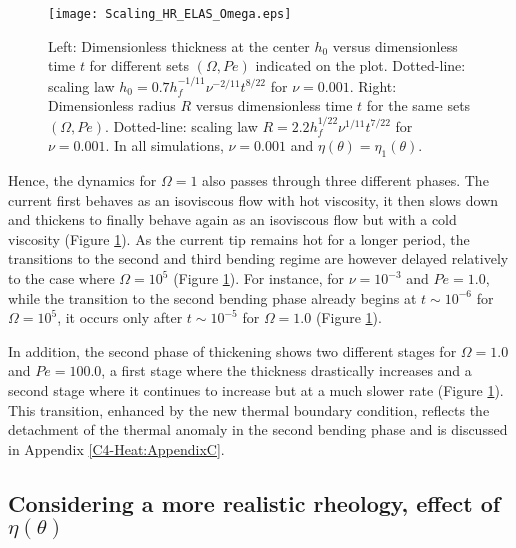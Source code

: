 \begin{figure}[h!]
  \begin{center}
    \graphicspath{ {/Users/thorey/Documents/These/Projet/Refroidissement/Skin_Model/Figure/Figure_Heating/} }
    \texttt{[image: Scaling\_HR\_ELAS\_Omega.eps]}
    \caption{Left: Dimensionless thickness at  the center $h_0$ versus
      dimensionless   time  $t$   for  different   sets  $(\Omega,Pe)$
      indicated    on   the    plot.     Dotted-line:   scaling    law
      $h_0=   0.7h_f^{-1/11}\nu^{-2/11}t^{8/22}$    for   $\nu=0.001$.
      Right: Dimensionless  radius $R$  versus dimensionless  time $t$
      for  the  same  sets $(\Omega,Pe)$.   Dotted-line:  scaling  law
      $R= 2.2h_f^{1/22}\nu^{1/11}t^{7/22}$ for $\nu  = 0.001$.  In all
      simulations, $\nu=0.001$ and $\eta(\theta)=\eta_1(\theta)$.}
    \label{C4-Scaling_HR_ELAS_Omega}
  \end{center}
\end{figure}


Hence, the dynamics for $\Omega=1$ also passes through three different
phases.   The current  first behaves  as an  isoviscous flow  with hot
viscosity, it then slows down and  thickens to finally behave again as
an   isoviscous    flow   but   with   a    cold   viscosity   (Figure
\ref{C4-Scaling_HR_ELAS_Omega}).  As the current tip remains hot for a
longer period, the transitions to the second and third bending
regime are however delayed relatively to the case where $\Omega= 10^5$
(Figure    \ref{C4-Scaling_HR_ELAS_Omega}).     For   instance,    for
$\nu=10^{-3}$ and $Pe=1.0$, while the transition to the second bending
phase already begins at $t\sim 10^{-6}$ for $\Omega=10^{5}$, it occurs
only    after   $t\sim    10^{-5}$   for    $\Omega=   1.0$    (Figure
\ref{C4-Scaling_HR_ELAS_Omega}).

In addition, the second phase of thickening shows two different stages
for $\Omega =  1.0$ and $Pe=100.0$, a first stage  where the thickness
drastically  increases  and  a  second stage  where  it  continues  to
increase     but     at     a     much     slower     rate     (Figure
\ref{C4-Scaling_HR_ELAS_Omega}).  This transition, enhanced by the new
thermal  boundary condition,  reflects the  detachment of  the thermal
anomaly  in the  second bending  phase  and is  discussed in  Appendix
\ref{C4-Heat:AppendixC}.

\subsection{Considering   a  more   realistic   rheology,  effect   of
  $\eta(\theta)$}
\label{C4-sec:infl-therm-bound-el}


